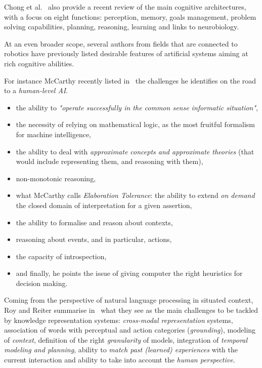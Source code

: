 \documentclass[a4paper, twocolumn]{article}
\begin{document}
Chong et al.~\cite{Chong2009} also provide a recent review of the main cognitive
architectures, with a focus on eight functions: perception, memory, goals
management, problem solving capabilities, planning, reasoning, learning and
links to neurobiology.

At an even broader scope, several authors from fields that are connected to
robotics have previously listed desirable features of artificial systems aiming
at rich cognitive abilities.

For instance McCarthy recently listed in~\cite{McCarthy2007} the challenges he
identifies on the road to a \emph{human-level AI}.

\begin{itemize}

	\item the ability to \emph{"operate successfully in the common sense
	informatic situation"},

	\item the necessity of relying on mathematical logic, as the most fruitful
	formalism for machine intelligence,

	\item the ability to deal with \emph{approximate concepts and approximate
	theories} (that would include representing them, and reasoning with them),

	\item non-monotonic reasoning,

	\item what McCarthy calls \emph{Elaboration Tolerance}: the ability to
	extend \emph{on demand} the closed domain of interpretation for a
	given assertion,

	\item the ability to formalise and reason about contexts,

	\item reasoning about events, and in particular, actions,

	\item the capacity of introspection,

	\item and finally, he points the issue of giving computer the right
	heuristics for decision making.

\end{itemize}

Coming from the perspective of natural language processing in situated context,
Roy and Reiter summarise in~\cite{Roy2005} what they see as the main challenges
to be tackled by knowledge representation systems: \emph{cross-modal
representation} systems, association of words with perceptual and action
categories (\emph{grounding}), modeling of \emph{context}, definition of the
right \emph{granularity} of models, integration of \emph{temporal modeling and
planning}, ability to \emph{match past (learned) experiences} with the current
interaction and ability to take into account the \emph{human perspective}.
\end{document}
